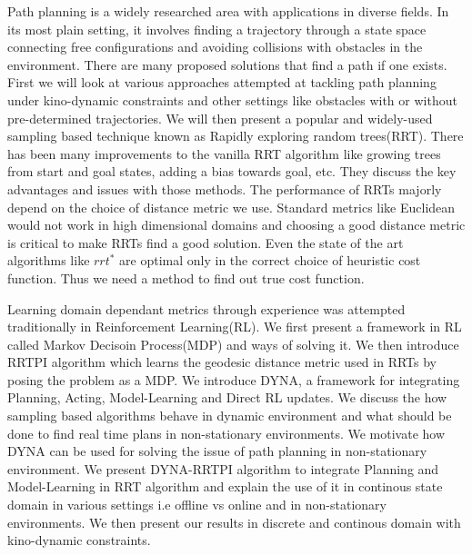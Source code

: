 \documentclass[MTech]{iitmdiss}
\begin{document}
\abstract
Path planning is a widely researched area with applications in diverse fields. In its most plain setting, it involves finding a trajectory through a state space connecting free configurations and avoiding collisions with obstacles in the environment. There are many proposed solutions that find a path if one exists. First we will look at various approaches attempted at tackling path planning under kino-dynamic constraints and other settings like obstacles with or without pre-determined trajectories. We will then present a popular and widely-used sampling based technique known as Rapidly exploring random trees(RRT). There has been many improvements to the vanilla RRT algorithm like growing trees from start and goal states, adding a bias towards goal, etc. They discuss the key advantages and issues with those methods. The performance of RRTs majorly depend on the choice of  distance metric we use. Standard metrics like Euclidean would not work in high dimensional domains and choosing a good distance metric is critical to make RRTs find a good solution. Even the state of the art algorithms like $rrt^*$ are optimal only in the correct choice of heuristic cost function. Thus we need a method to find out true cost function.

Learning domain dependant metrics through experience was attempted traditionally in Reinforcement Learning(RL). We first present a framework in RL called Markov Decisoin Process(MDP) and ways of solving it. We then introduce RRTPI algorithm which learns the geodesic distance metric used in RRTs by posing the problem as a MDP. We introduce DYNA, a framework for integrating Planning, Acting, Model-Learning and Direct RL updates. We discuss the how sampling based algorithms behave in dynamic environment and what should be done to find real time plans in non-stationary environments.
We motivate how DYNA  can be used for solving the issue of path planning in non-stationary environment. We present DYNA-RRTPI algorithm to integrate Planning and Model-Learning in RRT algorithm and explain the use of it in continous state domain in various settings i.e offline vs online and in non-stationary environments. We then present our results in discrete and  continous domain with kino-dynamic constraints.

\pagebreak


\begin{singlespace}
\tableofcontents
\thispagestyle{empty}

\listoftables
{}
\listoffigures
{}
\end{singlespace}
\end{document}
